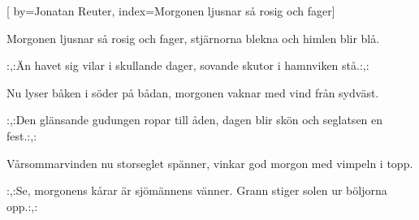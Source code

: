 


[ 	%
	by={Jonatan Reuter},	%
	index={Morgonen ljusnar så rosig och fager}]		%
	
\beginverse*		%
Morgonen ljusnar så rosig och fager,
stjärnorna blekna och himlen blir blå.
\endverse			%

\beginchorus		%
:,:Än havet sig vilar i skullande dager,
sovande skutor i hamnviken stå.:,:
\endchorus			%

\beginverse*		%
Nu lyser båken i söder på bådan,
morgonen vaknar med vind från sydväst.
\endverse			%

\beginchorus		%
:,:Den glänsande gudungen ropar till åden,
dagen blir skön och seglatsen en fest.:,:
\endchorus			%

\beginverse*		%
Vårsommarvinden nu storseglet spänner,
vinkar god morgon med vimpeln i topp.
\endverse			%

\beginchorus		%
:,:Se, morgonens kårar är sjömännens vänner.
Grann stiger solen ur böljorna opp.:,:
\endchorus			%
\endsong			%

